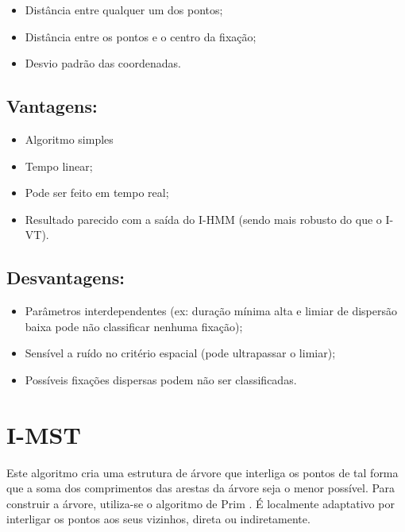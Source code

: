 \documentclass[brazil,]{report}
\begin{document}
\begin{itemize}
\itemsep1pt\parskip0pt
\item
  Distância entre qualquer um dos pontos;
\item
  Distância entre os pontos e o centro da fixação;
\item
  Desvio padrão das coordenadas.
\end{itemize}

\subsection{Vantagens:}\label{vantagens-2}

\begin{itemize}
\itemsep1pt\parskip0pt
\item
  Algoritmo simples
\item
  Tempo linear;
\item
  Pode ser feito em tempo real;
\item
  Resultado parecido com a saída do \gls{I-HMM} (sendo mais robusto do
  que o \gls{I-VT}).
\end{itemize}

\subsection{Desvantagens:}\label{desvantagens-2}

\begin{itemize}
\itemsep1pt\parskip0pt
\item
  Parâmetros interdependentes (ex: duração mínima alta e limiar de
  dispersão baixa pode não classificar nenhuma fixação);
\item
  Sensível a ruído no critério espacial (pode ultrapassar o limiar);
\item
  Possíveis fixações dispersas podem não ser classificadas.
\end{itemize}

\section{\gls{I-MST}}\label{section-3}

Este algoritmo cria uma estrutura de árvore que interliga os pontos de
tal forma que a soma dos comprimentos das arestas da árvore seja o menor
possível. Para construir a árvore, utiliza-se o algoritmo de Prim . É
localmente adaptativo por interligar os pontos aos seus vizinhos, direta
ou indiretamente.
\end{document}
